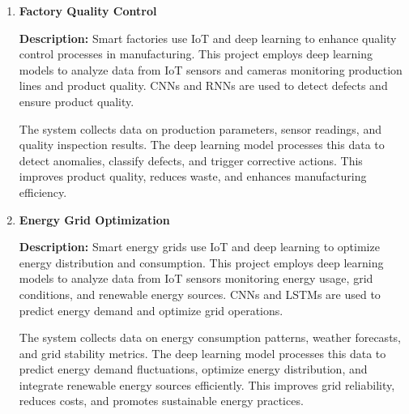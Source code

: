 \documentclass{article}
\begin{document}
\begin{enumerate}[label=\textbf{\arabic*.}, leftmargin=*]


\vspace{24pt} %
\item \textbf{Factory Quality Control}

\textbf{Description:}
Smart factories use IoT and deep learning to enhance quality control processes in manufacturing. This project employs deep learning models to analyze data from IoT sensors and cameras monitoring production lines and product quality. CNNs and RNNs are used to detect defects and ensure product quality.

The system collects data on production parameters, sensor readings, and quality inspection results. The deep learning model processes this data to detect anomalies, classify defects, and trigger corrective actions. This improves product quality, reduces waste, and enhances manufacturing efficiency.



\vspace{24pt} %
\item \textbf{Energy Grid Optimization}

\textbf{Description:}
Smart energy grids use IoT and deep learning to optimize energy distribution and consumption. This project employs deep learning models to analyze data from IoT sensors monitoring energy usage, grid conditions, and renewable energy sources. CNNs and LSTMs are used to predict energy demand and optimize grid operations.

The system collects data on energy consumption patterns, weather forecasts, and grid stability metrics. The deep learning model processes this data to predict energy demand fluctuations, optimize energy distribution, and integrate renewable energy sources efficiently. This improves grid reliability, reduces costs, and promotes sustainable energy practices.



\end{enumerate}
\end{document}
